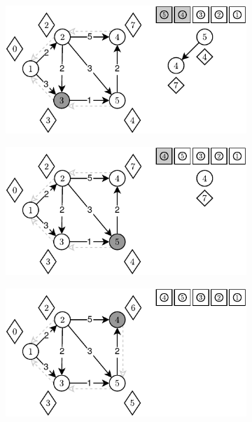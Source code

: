 \begin{figure}[!htbp]
\begin{subfigure}[b]{0.33\textwidth}
		\caption{}
	\end{subfigure}
	\begin{subfigure}[b]{0.33\textwidth}
		\includegraphics[width=\textwidth]{Chapter_II/R-HEAP-Example/d.pdf}
		\caption{}
	\end{subfigure}%
	\begin{subfigure}[b]{0.33\textwidth}
		\includegraphics[width=\textwidth]{Chapter_II/R-HEAP-Example/e.pdf}
		\caption{}
	\end{subfigure}
	\begin{subfigure}[b]{0.33\textwidth}
		\includegraphics[width=\textwidth]{Chapter_II/R-HEAP-Example/f.pdf}

\end{subfigure}
\end{figure}
